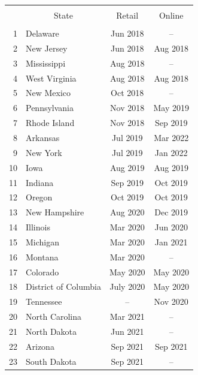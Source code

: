 \begin{tabular}{@{\extracolsep{5pt}} rlcc} 
\\[-1.8ex]\hline 
\hline \\[-1.8ex] 
 & \multicolumn{1}{c}{State} & Retail & Online\\ 
\hline \\[-1.8ex] 
1  & Delaware             & Jun 2018   &   --            \\ 
2  & New Jersey           & Jun 2018   & Aug 2018      \\ 
3  & Mississippi          & Aug 2018   &   --            \\ 
4  & West Virginia        & Aug 2018   & Aug 2018      \\ 
5  & New Mexico           & Oct 2018   &   --            \\ 
6  & Pennsylvania         & Nov 2018   & May 2019      \\ 
7  & Rhode Island         & Nov 2018   & Sep 2019      \\ 
8  & Arkansas             & Jul 2019   & Mar 2022      \\ 
9  & New York             & Jul 2019   & Jan 2022      \\ 
10 & Iowa                 & Aug 2019   & Aug 2019      \\ 
11 & Indiana              & Sep 2019   & Oct 2019      \\ 
12 & Oregon               & Oct 2019   & Oct 2019      \\ 
13 & New Hampshire        & Aug 2020   & Dec 2019      \\ 
14 & Illinois             & Mar 2020   & Jun 2020      \\ 
15 & Michigan             & Mar 2020   & Jan 2021      \\ 
16 & Montana              & Mar 2020   &  --             \\ 
17 & Colorado             & May 2020   & May 2020      \\ 
18 & District of Columbia & July 2020  & May 2020      \\ 
19 & Tennessee            &    --        & Nov 2020      \\ 
20 & North Carolina       & Mar 2021   &     --          \\ 
21 & North Dakota         & Jun 2021   &       --        \\ 
22 & Arizona              & Sep 2021   & Sep 2021      \\ 
23 & South Dakota         & Sep 2021   &    --           \\ 

\end{tabular}
